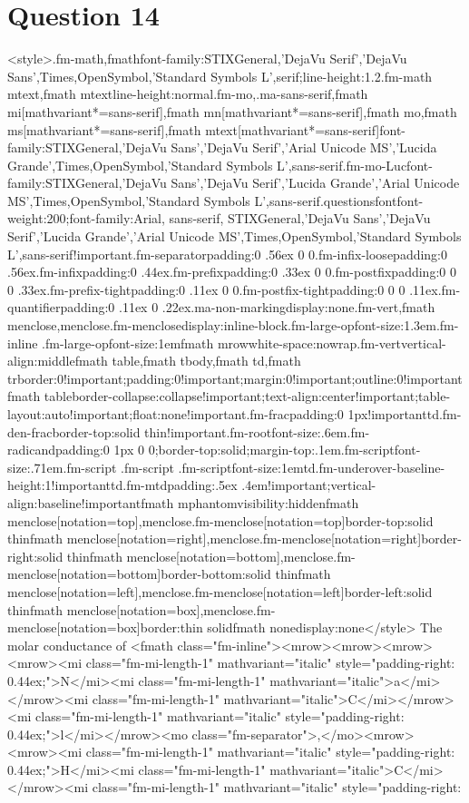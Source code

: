 \documentclass{article}
\begin{document}
\section*{Question 14}
<style>.fm-math,fmath{font-family:STIXGeneral,'DejaVu Serif','DejaVu Sans',Times,OpenSymbol,'Standard Symbols L',serif;line-height:1.2}.fm-math mtext,fmath mtext{line-height:normal}.fm-mo,.ma-sans-serif,fmath mi[mathvariant*=sans-serif],fmath mn[mathvariant*=sans-serif],fmath mo,fmath ms[mathvariant*=sans-serif],fmath mtext[mathvariant*=sans-serif]{font-family:STIXGeneral,'DejaVu Sans','DejaVu Serif','Arial Unicode MS','Lucida Grande',Times,OpenSymbol,'Standard Symbols L',sans-serif}.fm-mo-Luc{font-family:STIXGeneral,'DejaVu Sans','DejaVu Serif','Lucida Grande','Arial Unicode MS',Times,OpenSymbol,'Standard Symbols L',sans-serif}.questionsfont{font-weight:200;font-family:Arial, sans-serif, STIXGeneral,'DejaVu Sans','DejaVu Serif','Lucida Grande','Arial Unicode MS',Times,OpenSymbol,'Standard Symbols L',sans-serif!important}.fm-separator{padding:0 .56ex 0 0}.fm-infix-loose{padding:0 .56ex}.fm-infix{padding:0 .44ex}.fm-prefix{padding:0 .33ex 0 0}.fm-postfix{padding:0 0 0 .33ex}.fm-prefix-tight{padding:0 .11ex 0 0}.fm-postfix-tight{padding:0 0 0 .11ex}.fm-quantifier{padding:0 .11ex 0 .22ex}.ma-non-marking{display:none}.fm-vert,fmath menclose,menclose.fm-menclose{display:inline-block}.fm-large-op{font-size:1.3em}.fm-inline .fm-large-op{font-size:1em}fmath mrow{white-space:nowrap}.fm-vert{vertical-align:middle}fmath table,fmath tbody,fmath td,fmath tr{border:0!important;padding:0!important;margin:0!important;outline:0!important}fmath table{border-collapse:collapse!important;text-align:center!important;table-layout:auto!important;float:none!important}.fm-frac{padding:0 1px!important}td.fm-den-frac{border-top:solid thin!important}.fm-root{font-size:.6em}.fm-radicand{padding:0 1px 0 0;border-top:solid;margin-top:.1em}.fm-script{font-size:.71em}.fm-script .fm-script .fm-script{font-size:1em}td.fm-underover-base{line-height:1!important}td.fm-mtd{padding:.5ex .4em!important;vertical-align:baseline!important}fmath mphantom{visibility:hidden}fmath menclose[notation=top],menclose.fm-menclose[notation=top]{border-top:solid thin}fmath menclose[notation=right],menclose.fm-menclose[notation=right]{border-right:solid thin}fmath menclose[notation=bottom],menclose.fm-menclose[notation=bottom]{border-bottom:solid thin}fmath menclose[notation=left],menclose.fm-menclose[notation=left]{border-left:solid thin}fmath menclose[notation=box],menclose.fm-menclose[notation=box]{border:thin solid}fmath none{display:none}</style> The molar conductance of <fmath class="fm-inline"><mrow><mrow><mrow><mrow><mi class="fm-mi-length-1" mathvariant="italic" style="padding-right: 0.44ex;">N</mi><mi class="fm-mi-length-1" mathvariant="italic">a</mi></mrow><mi class="fm-mi-length-1" mathvariant="italic">C</mi></mrow><mi class="fm-mi-length-1" mathvariant="italic" style="padding-right: 0.44ex;">l</mi></mrow><mo class="fm-separator">,</mo><mrow><mrow><mi class="fm-mi-length-1" mathvariant="italic" style="padding-right: 0.44ex;">H</mi><mi class="fm-mi-length-1" mathvariant="italic">C</mi></mrow><mi class="fm-mi-length-1" mathvariant="italic" style="padding-right: 
\end{document}
